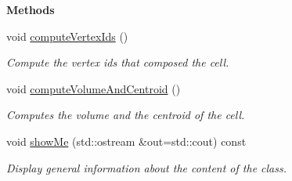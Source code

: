 \begin{Indent}{\bf Methods}
\begin{DoxyCompactItemize}
void \hyperlink{classFVCode3D_1_1Mesh3D_1_1Cell3D_ae410bd71367b8bb52d9e4b1a53a2bb13}{compute\+Vertex\+Ids} ()
\begin{DoxyCompactList}\small\item\em Compute the vertex ids that composed the cell. \end{DoxyCompactList}\item 
void \hyperlink{classFVCode3D_1_1Mesh3D_1_1Cell3D_ae4ba3b75f888448f83672fcef7d24f2c}{compute\+Volume\+And\+Centroid} ()
\begin{DoxyCompactList}\small\item\em Computes the volume and the centroid of the cell. \end{DoxyCompactList}\item 
void \hyperlink{classFVCode3D_1_1Mesh3D_1_1Cell3D_a215649b0f0eac6a30031f98a38f191e6}{show\+Me} (std\+::ostream \&out=std\+::cout) const 
\begin{DoxyCompactList}\small\item\em Display general information about the content of the class. \end{DoxyCompactList}\end{DoxyCompactItemize}
\end{Indent}
